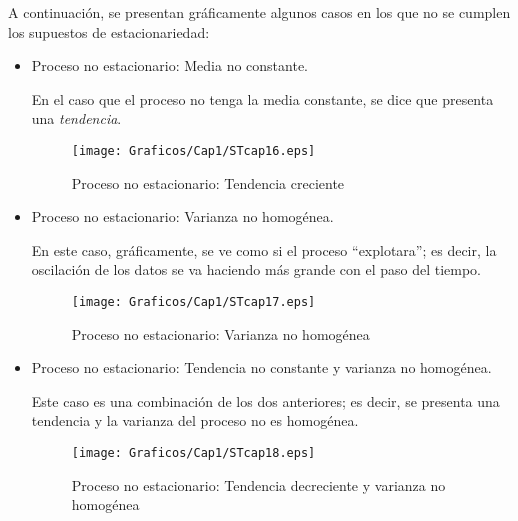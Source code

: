 A continuaci\'{o}n, se presentan gr\'{a}ficamente algunos casos en los que no se cumplen los supuestos de estacionariedad:

\begin{itemize}
\item Proceso no estacionario: Media no constante.

En el caso que el proceso no tenga la media constante, se dice que presenta una \emph{tendencia}.

\begin{figure}[H]
\centering
\texttt{[image: Graficos/Cap1/STcap16.eps]}
\caption{Proceso no estacionario: Tendencia creciente}
\end{figure}

\item Proceso no estacionario: Varianza no homog\'{e}nea.

En este caso, gr\'{a}ficamente, se ve como si el proceso ``explotara''; es decir, la oscilaci\'{o}n de los datos se va haciendo m\'{a}s grande con el paso del tiempo. 

\begin{figure}[H]
\centering
\texttt{[image: Graficos/Cap1/STcap17.eps]}
\caption{Proceso no estacionario: Varianza no homog\'{e}nea}
\end{figure}

\item Proceso no estacionario: Tendencia no constante y varianza no homog\'{e}nea.

Este caso es una combinaci\'{o}n de los dos anteriores; es decir, se presenta una tendencia y la varianza del proceso no es homog\'{e}nea.

\begin{figure}[H]
\centering
\texttt{[image: Graficos/Cap1/STcap18.eps]}
\caption{Proceso no estacionario: Tendencia decreciente y varianza no homog\'{e}nea}
\end{figure}
\end{itemize}

